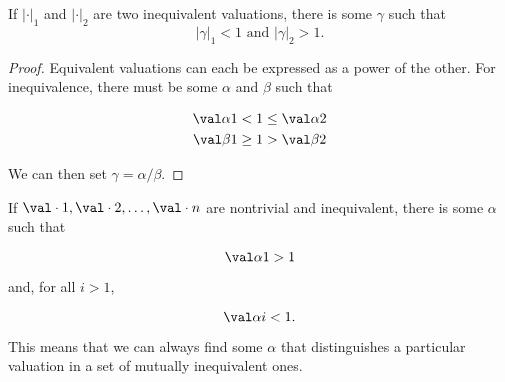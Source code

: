 \begin{lemma}
  If $|\cdot|_1$ and $|\cdot|_2$ are two inequivalent valuations, there is
  some $\gamma$ such that \[|\gamma|_1 < 1 \text{ and } |\gamma|_2 > 1.\]
\end{lemma}

\begin{proof}
  Equivalent valuations can each be expressed as a power of the other. For
  inequivalence, there must be some $\alpha$ and $\beta$ such that

  \begin{align*}
    \val \alpha 1 &<    1 \leq \val \alpha 2 \\
    \val \beta 1  &\geq 1 >    \val \beta 2
  \end{align*}

  We can then set $\gamma = \alpha/\beta$.
\end{proof}

\begin{lemma}
  If $\val \cdot 1, \val \cdot 2, \ldots, \val \cdot n$ are nontrivial and
  inequivalent, there is some $\alpha$ such that

  \[\val \alpha 1 > 1 \]

  and, for all $i > 1$,

  \[ \val \alpha i < 1.\]
\end{lemma}

This means that we can always find some $\alpha$ that distinguishes a particular
valuation in a set of mutually inequivalent ones.

